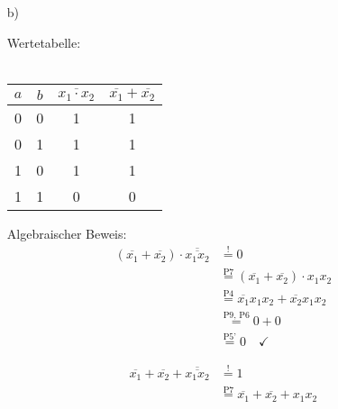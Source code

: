 \documentclass{article}
\newcommand{\nyet}{\overline}
\begin{document}
\begin{enumerate}
		\item[b)]
		\begin{minipage}[t]{0.27\textwidth}
			Wertetabelle:\\\\
			\begin{tabular}[t]{cc|cc}
				$a$ & $b$ & $\nyet{x_1 \cdot x_2}$ & $ \nyet{x_1} + \nyet{x_2}$ \\ \hline
				0 & 0 & 1 & 1 \\
				0 & 1 & 1 & 1 \\
				1 & 0 & 1 & 1 \\
				1 & 1 & 0 & 0
			\end{tabular}
		\end{minipage}
		\begin{minipage}[t]{0.35\textwidth}
			Algebraischer Beweis: 
			\begin{align*}
				(\nyet{x_1} + \nyet{x_2}) \cdot \nyet{\nyet{x_1 x_2}} &\stackrel{!}{=} 0 \\
				&\stackrel{\text{P7}}{=} (\nyet{x_1} + \nyet{x_2}) \cdot x_1 x_2 \\
				&\stackrel{\text{P4}}{=} \nyet{x_1} x_1 x_2 + \nyet{x_2} x_1 x_2 \\
				&\stackrel{\text{P9, P6}}{=} 0 + 0 \\
				&\stackrel{\text{P5'}}{=} 0 \quad \checkmark
			\end{align*}
		\end{minipage}
		\begin{minipage}[t]{0.3\textwidth}
			\vspace{0.3em}
			\begin{align*}
				\nyet{x_1} + \nyet{x_2} + \nyet{\nyet{x_1 x_2}} &\stackrel{!}{=} 1 \\
				&\stackrel{\text{P7}}{=} \nyet{x_1} + \nyet{x_2} + x_1 x_2 
			\end{align*}
		\end{minipage}
	\end{enumerate}
\end{document}
